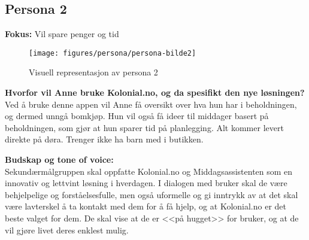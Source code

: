 \subsection{\textbf{Persona 2}}
\textbf{Fokus:} Vil spare penger og tid

\begin{figure}[!h] 
    \centering
    \texttt{[image: figures/persona/persona-bilde2]}
    \caption[Persona 2]{Visuell representasjon av persona 2
    \label{fig:persona2}}
\end{figure}

\textbf{Hvorfor vil Anne bruke Kolonial.no, og da spesifikt den nye løsningen?}\newline
Ved å bruke denne appen vil Anne få oversikt over hva hun har i beholdningen, og dermed unngå bomkjøp. Hun vil også få ideer til middager basert på beholdningen, som gjør at hun sparer tid på planlegging. Alt kommer levert direkte på døra. Trenger ikke ha barn med i butikken. 

\textbf{Budskap og tone of voice:}
\\Sekundærmålgruppen skal oppfatte Kolonial.no og Middagsassistenten som en innovativ og lettvint løsning i hverdagen. I dialogen med bruker skal de være behjelpelige og forståelsesfulle, men også uformelle og gi inntrykk av at det skal være lavterskel å ta kontakt med dem for å få hjelp, og at Kolonial.no er det beste valget for dem. De skal vise at de er <<på hugget>> for bruker, og at de vil gjøre livet deres enklest mulig. 
